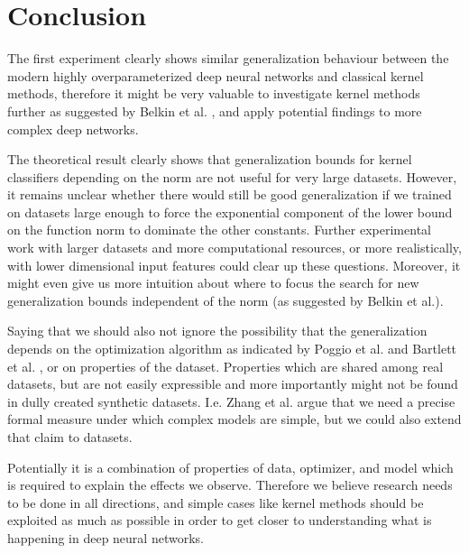 \section{Conclusion}

The first experiment clearly shows similar generalization behaviour between the modern highly overparameterized deep neural networks and classical kernel methods, therefore it might be very valuable to investigate kernel methods further as suggested by Belkin et al. \cite{belkin2018a}, and apply potential findings to more complex deep networks.

The theoretical result clearly shows that generalization bounds for kernel classifiers depending on the norm are not useful for very large datasets. However, it remains unclear whether there would still be good generalization if we trained on datasets large enough to force the exponential component of the lower bound on the function norm to dominate the other constants. Further experimental work with larger datasets and more computational resources, or more realistically, with lower dimensional input features could clear up these questions. Moreover, it might even give us more intuition about where to focus the search for new generalization bounds independent of the norm (as suggested by Belkin et al.).


Saying that we should also not ignore the possibility that the generalization depends on the optimization algorithm as indicated by Poggio et al. \cite{poggio2018} and Bartlett et al. \cite{bartlett2017}, or on properties of the dataset. Properties which are shared among real datasets, but are not easily expressible and more importantly might not be found in dully created synthetic datasets. I.e. Zhang et al. \cite{zhang2017} argue that we need a precise formal measure under which complex models are simple, but we could also extend that claim to datasets. 


Potentially it is a combination of properties of data, optimizer, and model which is required to explain the effects we observe. Therefore we believe research needs to be done in all directions, and simple cases like kernel methods should be exploited as much as possible in order to get closer to understanding what is happening in deep neural networks.
